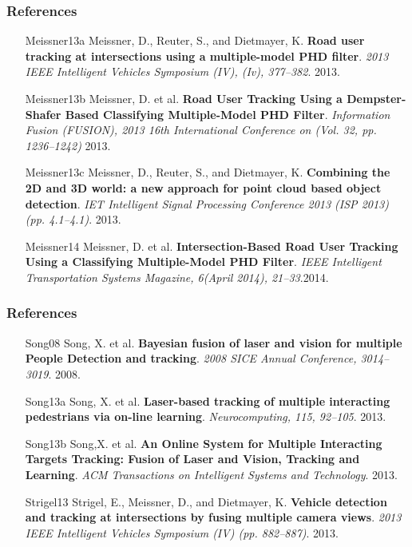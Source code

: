 \documentclass[table]{beamer}
\begin{document}
\frame
{
	\frametitle{References}
		\footnotesize{
	\begin{itemize}[leftmargin=.6in]
		\item [Meissner13a] Meissner, D., Reuter, S., and Dietmayer, K. \textbf{Road user tracking at intersections using a multiple-model PHD filter}. \textit{2013 IEEE Intelligent Vehicles Symposium (IV), (Iv), 377–382}. 2013.
		\item [Meissner13b] Meissner, D. et al. \textbf{Road User Tracking Using a Dempster-Shafer Based Classifying Multiple-Model PHD Filter}. \textit{Information Fusion (FUSION), 2013 16th International Conference on (Vol. 32, pp. 1236–1242)} 2013.
		\item [Meissner13c] Meissner, D., Reuter, S., and Dietmayer, K. \textbf{Combining the 2D and 3D world: a new approach for point cloud based object detection}. \textit{IET Intelligent Signal Processing Conference 2013 (ISP 2013) (pp. 4.1–4.1)}. 2013.
		\item [Meissner14] Meissner, D. et al. \textbf{Intersection-Based Road User Tracking Using a Classifying Multiple-Model PHD Filter}.\textit{ IEEE Intelligent Transportation Systems Magazine, 6(April 2014), 21–33}.2014.		
	\end{itemize}	
	}
}

\frame
{
	\frametitle{References}
		\footnotesize{
	\begin{itemize}[leftmargin=.6in]
		\item [Song08] Song, X. et al. \textbf{Bayesian fusion of laser and vision for multiple People Detection and tracking}. \textit{2008 SICE Annual Conference, 3014–3019}. 2008.
		\item [Song13a] Song, X. et al. \textbf{Laser-based tracking of multiple interacting pedestrians via on-line learning}. \textit{Neurocomputing, 115, 92–105}. 2013.
		\item [Song13b] Song,X. et al. \textbf{An Online System for Multiple Interacting Targets Tracking: Fusion of Laser and Vision, Tracking and Learning}. \textit{ACM Transactions on Intelligent Systems and Technology}. 2013.
		\item [Strigel13] Strigel, E., Meissner, D., and Dietmayer, K. \textbf{Vehicle detection and tracking at intersections by fusing multiple camera views}. \textit{2013 IEEE Intelligent Vehicles Symposium (IV) (pp. 882–887)}. 2013.
	\end{itemize}	
	}
}
\end{document}
